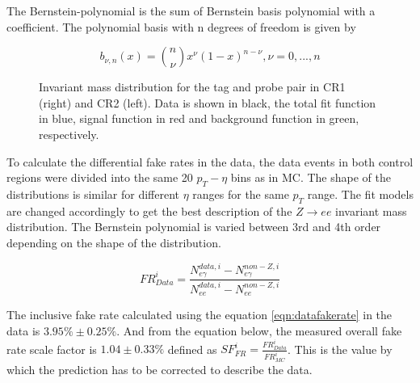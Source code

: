 The Bernstein-polynomial is the sum of Bernstein basis polynomial with a coefficient. The polynomial basis with n degrees of freedom is given by

\begin{equation}
b_{\nu,n}(x) = \binom{n}{\nu}x^\nu(1-x)^{n-\nu}, \nu = 0,...,n
\end{equation}

\begin{figure}[H]
\begin{center}
\scalebox{0.35}{}\scalebox{0.35}{}
\caption{Invariant mass distribution for the tag and probe pair in CR1 (right) and CR2 (left). Data is shown in black, the total fit function in blue, signal function in red and background function in green, respectively.}
\label{fig:fit}
\end{center}
\end{figure}

To calculate the differential fake rates in the data, the data events in both control regions were divided into the same 20 $p_{T}-\eta$ bins as in MC. The shape of the distributions is similar for different $\eta$ ranges for the same $p_{T}$ range. The fit models are changed accordingly to get the best description of the $Z\rightarrow ee$ invariant mass distribution. The Bernstein polynomial is varied between 3rd and 4th order depending on the shape of the distribution.

\begin{equation}
FR_{Data}^i = \frac{N_{e\gamma}^{data,i}-N_{e\gamma}^{non-Z,i}}{N_{ee}^{data,i}-N_{ee}^{non-Z,i}}
\label{eqn:datafakerate}
\end{equation}

The inclusive fake rate calculated using the equation \ref{eqn:datafakerate} in the data is $3.95\%\pm0.25\%$. And from the equation below, the measured overall fake rate scale factor is $1.04\pm0.33\%$ defined as $SF_{FR}^i = \frac{FR_{Data}^i}{FR_{MC}^i}$. This is the value by which the prediction has to be corrected to describe the data.

